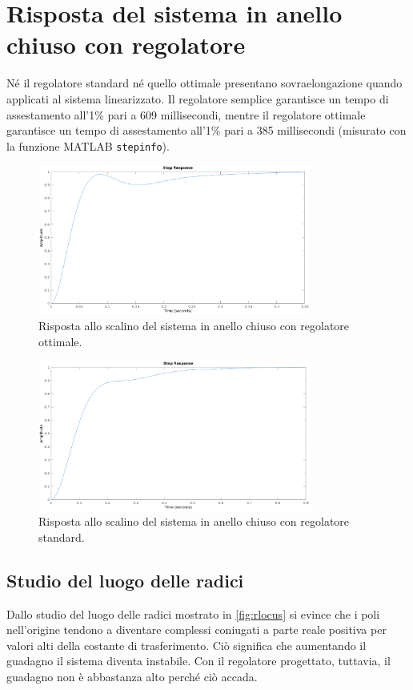 \documentclass[a4paper]{article}
\begin{document}
\section{Risposta del sistema in anello chiuso con regolatore}
Né il regolatore standard né quello ottimale presentano sovraelongazione quando applicati al sistema linearizzato.
Il regolatore semplice garantisce un tempo di assestamento all'1\% pari a 609 millisecondi, mentre il regolatore ottimale garantisce un tempo di assestamento all'1\% pari a 385 millisecondi (misurato con la funzione MATLAB \texttt{stepinfo}).
\begin{figure}[h!]
    \centering
    \includegraphics[width=0.8\textwidth]{step_opt}
    \caption{Risposta allo scalino del sistema in anello chiuso con regolatore ottimale.}
    \label{fig:step_opt}
    \end{figure}
\begin{figure}[h!]
    \centering
    \includegraphics[width=0.8\textwidth]{step_sta}
    \caption{Risposta allo scalino del sistema in anello chiuso con regolatore standard.}
    \label{fig:step_sta}
\end{figure}

\subsection{Studio del luogo delle radici}
Dallo studio del luogo delle radici mostrato in \cref{fig:rlocus} si evince che i poli nell'origine tendono a diventare complessi coniugati a parte reale positiva per valori alti della costante di trasferimento.
Ciò significa che aumentando il guadagno il sistema diventa instabile.
Con il regolatore progettato, tuttavia, il guadagno non è abbastanza alto perché ciò accada.
\end{document}
